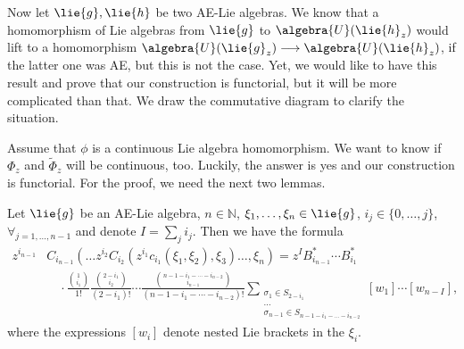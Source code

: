 Now let $\lie{g}, \lie{h}$ be two AE-Lie algebras. We know that a homomorphism 
of Lie algebras from $\lie{g}$ to $\algebra{U}(\lie{h}_z)$ would lift to a 
homomorphism $\algebra{U}(\lie{g}_z) \longrightarrow \algebra{U}(\lie{h}_z)$, 
if the latter one was AE, but this is not the case. Yet, we would like to have 
this result and prove that our construction is functorial, but it will be 
more complicated than that. We draw the commutative diagram to clarify the 
situation.
\begin{center}
\end{center}
Assume that $\phi$ is a continuous Lie algebra homomorphism. We want to know if 
$\Phi_z$ and $\widetilde{\Phi}_z$ will be continuous, too. Luckily, the answer 
is yes and our construction is functorial. For the proof, we need the 
next two lemmas.
\begin{lemma}
    \label{LCAna:Lemma:NStarPrePreSubResult}%
    Let $\lie{g}$ be an AE-Lie algebra, $n \in \mathbb{N}$, $\xi_1, \ldots, \xi_n 
    \in \lie{g}$, $i_j \in \{0, \ldots, j\}$, $\forall_{j = 1, 
    \ldots, n-1}$ and denote $I = \sum_j i_j$. Then we have the formula
	\begin{align}
		\nonumber
		z^{i_{n-1}} 
		&
		C_{i_{n-1}}\left(
			\ldots
			z^{i_2} C_{i_2} \left(
				z^{i_1} c_{i_1} \left(
					\xi_1, \xi_2
				\right)
				,
				\xi_3
			\right)
			\ldots,
			\xi_n
		\right)
		=
		z^I B_{i_{n-1}}^* \cdots B_{i_1}^*
		\\
		& \quad
		\cdot
		\frac{\binom{1}{i_1}}{1!} 
		\frac{\binom{2 -i_1}{i_2}}
		{(2-i_1)!}
		\cdots 
		\frac{\binom{n-1 - i_1 - \cdots - i_{n-2}}{i_{n-1}}}
		{(n-1 - i_1 - \cdots - i_{n-2})!}
		\sum\limits_{\substack{
			\sigma_1 \in S_{2 - i_1} \\
			\ldots\\
			\sigma_{n-1} \in S_{n-1 - i_1 - \ldots - i_{n-2}}			
		}}
		[w_1] \cdots [w_{n-I}],
	\end{align}
	where the expressions $[w_i]$ denote nested Lie brackets in the $\xi_i$.
\end{lemma}
